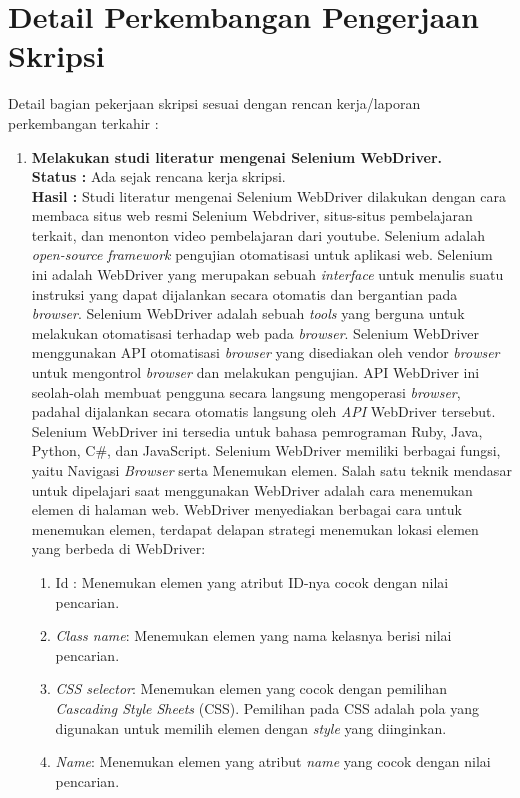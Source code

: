 \documentclass[a4paper,twoside]{article}
\begin{document}
\section{Detail Perkembangan Pengerjaan Skripsi}
Detail bagian pekerjaan skripsi sesuai dengan rencan kerja/laporan perkembangan terkahir :
	\begin{enumerate}
		\item \textbf{Melakukan studi literatur mengenai Selenium WebDriver.}\\
		{\bf Status :} Ada sejak rencana kerja skripsi.\\
		{\bf Hasil :} Studi literatur mengenai Selenium WebDriver dilakukan dengan cara membaca situs web resmi Selenium Webdriver, situs-situs pembelajaran terkait, dan menonton video
		pembelajaran dari youtube. Selenium adalah \textit{open-source} \textit{framework} pengujian otomatisasi untuk aplikasi web. Selenium ini adalah WebDriver yang merupakan sebuah \textit{interface} untuk menulis suatu instruksi yang dapat dijalankan secara otomatis dan bergantian pada \textit{browser}.  Selenium WebDriver adalah sebuah \textit{tools} yang berguna untuk melakukan otomatisasi terhadap web pada \textit{browser}. Selenium WebDriver menggunakan API otomatisasi \textit{browser} yang disediakan oleh vendor \textit{browser} untuk mengontrol \textit{browser} dan melakukan pengujian. API WebDriver ini seolah-olah membuat pengguna secara langsung mengoperasi \textit{browser}, padahal dijalankan secara otomatis langsung oleh \textit{API} WebDriver tersebut. Selenium WebDriver ini tersedia untuk bahasa pemrograman Ruby, Java, Python, C\#, dan JavaScript. Selenium WebDriver memiliki berbagai fungsi, yaitu Navigasi \textit{Browser} serta Menemukan elemen.
		Salah satu teknik mendasar untuk dipelajari saat menggunakan WebDriver adalah cara menemukan elemen di halaman web. WebDriver menyediakan berbagai cara untuk menemukan elemen, terdapat delapan strategi menemukan lokasi elemen yang berbeda di WebDriver:
		\begin{enumerate}
			\item Id : Menemukan elemen yang atribut ID-nya cocok dengan nilai pencarian.
			\item \textit{Class name}: Menemukan elemen yang nama kelasnya berisi nilai pencarian.	
			\item \textit{CSS selector}: Menemukan elemen yang cocok dengan pemilihan \textit{Cascading Style Sheets} (CSS). Pemilihan pada CSS adalah pola yang digunakan untuk memilih elemen dengan \textit{style} yang diinginkan.
			\item \textit{Name}: Menemukan elemen yang atribut \textit{name} yang cocok dengan nilai pencarian.

\end{enumerate}
\end{enumerate}
\end{document}
